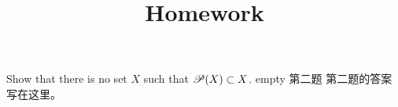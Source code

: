 

\title{Homework}
\author{\asemail}
\maketitle

\begin{enumerate}
\isep[1em]

\prob
	Show that there is no set $X$ such that $\mathscr P (X)\subset X$.
\soln
empty
\prob
	第二题
\soln
	第二题的答案写在这里。

\end{enumerate}

